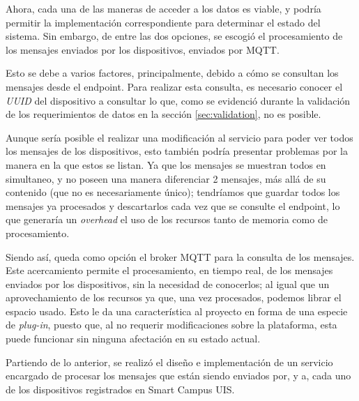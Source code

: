 Ahora, cada una de las maneras de acceder a los datos es viable, y podría permitir la implementación correspondiente para determinar el estado del sistema. Sin embargo, de entre las dos opciones, se escogió el procesamiento de los mensajes enviados por los dispositivos, enviados por MQTT. 

Esto se debe a varios factores, principalmente, debido a cómo se consultan los mensajes desde el endpoint. Para realizar esta consulta, es necesario conocer el \textit{UUID} del dispositivo a consultar lo que, como se evidenció durante la validación de los requerimientos de datos en la sección \ref{sec:validation}, no es posible.

Aunque sería posible el realizar una modificación al servicio para poder ver todos los mensajes de los dispositivos, esto también podría presentar problemas por la manera en la que estos se listan. Ya que los mensajes se muestran todos en simultaneo, y no poseen una manera diferenciar 2 mensajes, más allá de su contenido (que no es necesariamente único); tendríamos que guardar todos los mensajes ya procesados y descartarlos cada vez que se consulte el endpoint, lo que generaría un \textit{overhead} el uso de los recursos tanto de memoria como de procesamiento.

Siendo así, queda como opción el broker MQTT para la consulta de los mensajes. Este acercamiento permite el procesamiento, en tiempo real, de los mensajes enviados por los dispositivos, sin la necesidad de conocerlos; al igual que un aprovechamiento de los recursos ya que, una vez procesados, podemos librar el espacio usado. Esto le da una característica al proyecto en forma de una especie de \textit{plug-in}, puesto que, al no requerir modificaciones sobre la plataforma, esta puede funcionar sin ninguna afectación en su estado actual.

Partiendo de lo anterior, se realizó el diseño e implementación de un servicio encargado de procesar los mensajes que están siendo enviados por, y a, cada uno de los dispositivos registrados en Smart Campus UIS. 


